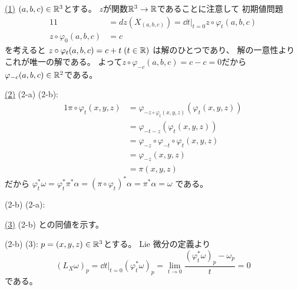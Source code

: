 \documentclass[report, notitlepage]{jlreq}
\begin{document}
\begin{answer}
    \uline{(1)} \quad
    $(a, b, c) \in \mathbb{R}^3$とする。
    $z$が関数$\mathbb{R}^3 \to \mathbb{R}$であることに注意して
    初期値問題
    \begin{alignat}{1}
        1 &= dz(X_{(a, b, c)})
            = \dd{t}\bigg|_{t = 0} z \circ \varphi_t(a, b, c) \\
        z \circ \varphi_0(a, b, c)
            &= c
    \end{alignat}
    を考えると
    $z \circ \varphi_t(a, b, c) = c + t \; (t \in \mathbb{R})$
    は解のひとつであり、
    解の一意性よりこれが唯一の解である。
    よって$z \circ \varphi_{-c}(a, b, c) = c - c = 0$だから
    $\varphi_{-c}(a, b, c) \in \mathbb{R}^2$である。

    \uline{(2)} \quad
    (2-a) \Rightarrow (2-b): \quad
    \begin{alignat}{1}
        \pi \circ \varphi_t(x, y, z)
            &= \varphi_{- z \circ \varphi_t(x, y, z)}(\varphi_t(x, y, z)) \\
            &= \varphi_{- t - z}(\varphi_t(x, y, z)) \\
            &= \varphi_{-z} \circ \varphi_{-t} \circ \varphi_t(x, y, z) \\
            &= \varphi_{-z} (x, y, z) \\
            &= \pi(x, y, z)
    \end{alignat}
    だから
    $\varphi_t^* \omega
        = \varphi_t^* \pi^* \alpha
        = (\pi \circ \varphi_t)^* \alpha
        = \pi^* \alpha
        = \omega$
    である。

    (2-b) \Rightarrow (2-a): \quad


    \uline{(3)} \quad
    (2-b) との同値を示す。

    (2-b) \Rightarrow (3): \quad
    $p = (x, y, z) \in \mathbb{R}^3$とする。
    Lie 微分の定義より
    \begin{equation}
        (L_X \omega)_p
            = \dd{t}\bigg|_{t = 0}
                (\varphi_t^* \omega)_p
            = \lim_{t \to 0}
                \frac{(\varphi_t^* \omega)_p - \omega_p}{t}
            = 0
    \end{equation}
    である。


\end{answer}
\end{document}
